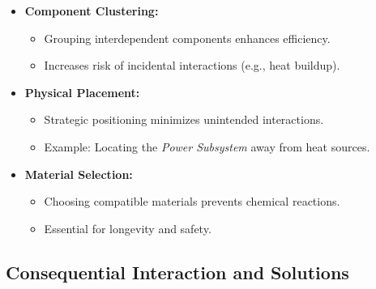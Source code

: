 \documentclass[12pt]{article}
\begin{document}
\begin{itemize}
    \item \textbf{Component Clustering:}
    \begin{itemize}
        \item Grouping interdependent components enhances efficiency.
        \item Increases risk of incidental interactions (e.g., heat buildup).
    \end{itemize}
    \item \textbf{Physical Placement:}
    \begin{itemize}
        \item Strategic positioning minimizes unintended interactions.
        \item Example: Locating the \textit{Power Subsystem} away from heat sources.
    \end{itemize}
    \item \textbf{Material Selection:}
    \begin{itemize}
        \item Choosing compatible materials prevents chemical reactions.
        \item Essential for longevity and safety.
    \end{itemize}
\end{itemize}

\subsection{Consequential Interaction and Solutions}
\end{document}
